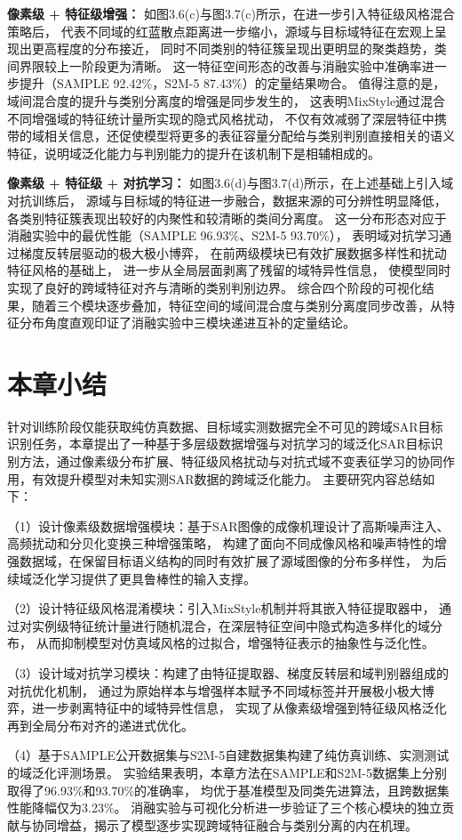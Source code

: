 \textbf{像素级 + 特征级增强：}
如图3.6(c)与图3.7(c)所示，在进一步引入特征级风格混合策略后，
代表不同域的红蓝散点距离进一步缩小，源域与目标域特征在宏观上呈现出更高程度的分布接近，
同时不同类别的特征簇呈现出更明显的聚类趋势，类间界限较上一阶段更为清晰。
这一特征空间形态的改善与消融实验中准确率进一步提升（SAMPLE 92.42\%，S2M-5 87.43\%）的定量结果吻合。
值得注意的是，域间混合度的提升与类别分离度的增强是同步发生的，
这表明MixStyle通过混合不同增强域的特征统计量所实现的隐式风格扰动，
不仅有效减弱了深层特征中携带的域相关信息，还促使模型将更多的表征容量分配给与类别判别直接相关的语义特征，说明域泛化能力与判别能力的提升在该机制下是相辅相成的。

\textbf{像素级 + 特征级 + 对抗学习：}
如图3.6(d)与图3.7(d)所示，在上述基础上引入域对抗训练后，
源域与目标域的特征进一步融合，数据来源的可分辨性明显降低，
各类别特征簇表现出较好的内聚性和较清晰的类间分离度。
这一分布形态对应于消融实验中的最优性能（SAMPLE 96.93\%、S2M-5 93.70\%），
表明域对抗学习通过梯度反转层驱动的极大极小博弈，
在前两级模块已有效扩展数据多样性和扰动特征风格的基础上，
进一步从全局层面剥离了残留的域特异性信息，
使模型同时实现了良好的跨域特征对齐与清晰的类别判别边界。
综合四个阶段的可视化结果，随着三个模块逐步叠加，特征空间的域间混合度与类别分离度同步改善，从特征分布角度直观印证了消融实验中三模块递进互补的定量结论。


\section{本章小结}
针对训练阶段仅能获取纯仿真数据、目标域实测数据完全不可见的跨域SAR目标识别任务，本章提出了一种基于多层级数据增强与对抗学习的域泛化SAR目标识别方法，通过像素级分布扩展、特征级风格扰动与对抗式域不变表征学习的协同作用，有效提升模型对未知实测SAR数据的跨域泛化能力。
主要研究内容总结如下：

（1）设计像素级数据增强模块：基于SAR图像的成像机理设计了高斯噪声注入、高频扰动和分贝化变换三种增强策略，
构建了面向不同成像风格和噪声特性的增强数据域，在保留目标语义结构的同时有效扩展了源域图像的分布多样性，
为后续域泛化学习提供了更具鲁棒性的输入支撑。

（2）设计特征级风格混淆模块：引入MixStyle机制并将其嵌入特征提取器中，
通过对实例级特征统计量进行随机混合，在深层特征空间中隐式构造多样化的域分布，
从而抑制模型对仿真域风格的过拟合，增强特征表示的抽象性与泛化性。

（3）设计域对抗学习模块：构建了由特征提取器、梯度反转层和域判别器组成的对抗优化机制，
通过为原始样本与增强样本赋予不同域标签并开展极小极大博弈，进一步剥离特征中的域特异性信息，
实现了从像素级增强到特征级风格泛化再到全局分布对齐的递进式优化。

（4）基于SAMPLE公开数据集与S2M-5自建数据集构建了纯仿真训练、实测测试的域泛化评测场景。
实验结果表明，本章方法在SAMPLE和S2M-5数据集上分别取得了96.93\%和93.70\%的准确率，
均优于基准模型及同类先进算法，且跨数据集性能降幅仅为3.23\%。
消融实验与可视化分析进一步验证了三个核心模块的独立贡献与协同增益，揭示了模型逐步实现跨域特征融合与类别分离的内在机理。



